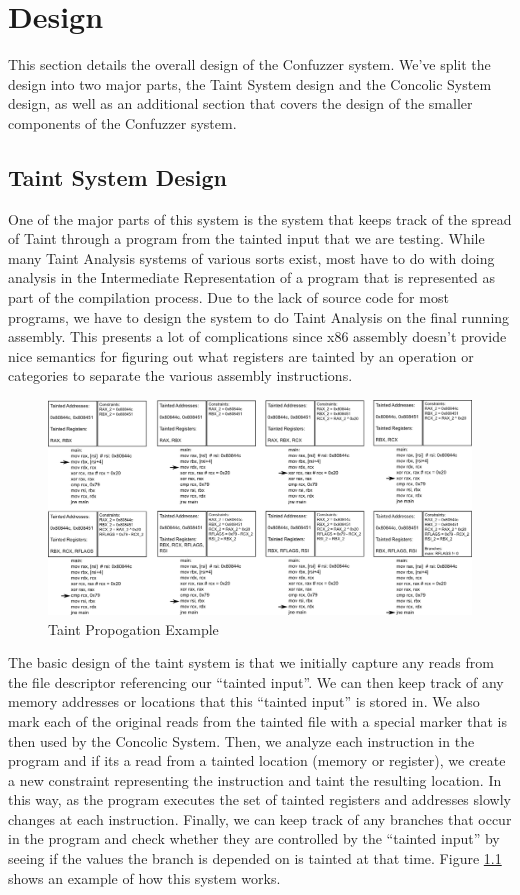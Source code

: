 \chapter{Design}
This section details the overall design of the Confuzzer system. We've split the
design into two major parts, the Taint System design and the Concolic System
design, as well as an additional section that covers the design of the smaller
components of the Confuzzer system.

\section{Taint System Design}
One of the major parts of this system is the system that keeps track of the
spread of Taint through a program from the tainted input that we are
testing. While many Taint Analysis systems of various sorts exist, most have to
do with doing analysis in the Intermediate Representation of a program that is
represented as part of the compilation process. Due to the lack of source code
for most programs, we have to design the system to do Taint Analysis on the
final running assembly. This presents a lot of complications since x86 assembly
doesn't provide nice semantics for figuring out what registers are tainted by an
operation or categories to separate the various assembly instructions.

\begin{figure}[htbp]
 \centering
 \includegraphics{taintprop}
 \caption{Taint Propogation Example}
 \label{figure:taintprop}
\end{figure}

The basic design of the taint system is that we initially capture any reads from
the file descriptor referencing our ``tainted input''. We can then keep track of
any memory addresses or locations that this ``tainted input'' is stored
in. We also mark each of the original reads from the tainted file with a special
marker that is then used by the Concolic System. Then, we analyze each
instruction in the program and if its a read from a tainted location (memory or
register), we create a new constraint representing the instruction and taint the
resulting location. In this way, as the program executes the set of tainted
registers and addresses slowly changes at each instruction. Finally, we can keep
track of any branches that occur in the program and check whether they are
controlled by the ``tainted input'' by seeing if the values the branch is
depended on is tainted at that time. Figure \ref{figure:taintprop} shows an
example of how this system works.

